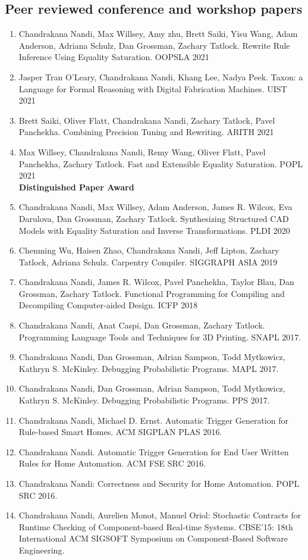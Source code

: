 \documentclass[margin, 10pt]{res} %
\begin{document}
\begin{resume}
\subsection{Peer reviewed conference and workshop papers}
\begin{enumerate}
  \item Chandrakana Nandi, Max Willsey, Amy zhu, Brett Saiki, Yisu Wang, Adam Anderson, Adriana Schulz, Dan Grossman, Zachary Tatlock.
    Rewrite Rule Inference Using Equality Saturation. OOPSLA 2021
\item Jasper Tran O'Leary, Chandrakana Nandi, Khang Lee, Nadya Peek.
  Taxon: a Language for Formal Reasoning with Digital Fabrication Machines. UIST 2021
\item Brett Saiki, Oliver Flatt, Chandrakana Nandi, Zachary Tatlock, Pavel Panchekha.
  Combining Precision Tuning and Rewriting. ARITH 2021
\item    Max Willsey, Chandrakana Nandi, Remy Wang, Oliver Flatt, Pavel Panchekha, Zachary Tatlock.
    Fast and Extensible Equality Saturation. POPL 2021 \\
    \textbf{Distinguished Paper Award}
\item Chandrakana Nandi, Max Willsey, Adam Anderson, James R. Wilcox, Eva Darulova, Dan Grossman, Zachary Tatlock.
    Synthesizing Structured CAD Models with Equality Saturation and Inverse Transformations. PLDI 2020
\item Chenming Wu, Haisen Zhao, Chandrakana Nandi, Jeff Lipton, Zachary Tatlock, Adriana Schulz. Carpentry Compiler. SIGGRAPH ASIA 2019
\item Chandrakana Nandi, James R. Wilcox, Pavel Panchekha, Taylor Blau, Dan Grossman, Zachary Tatlock. Functional Programming for Compiling and Decompiling Computer-aided Design. ICFP 2018
\item Chandrakana Nandi, Anat Caspi, Dan Grossman, Zachary Tatlock. Programming Language Tools and Techniques for 3D Printing. SNAPL 2017.
\item Chandrakana Nandi, Dan Grossman, Adrian Sampson, Todd Mytkowicz, Kathryn S. McKinley. Debugging Probabilistic Programs. MAPL 2017.
\item Chandrakana Nandi, Dan Grossman, Adrian Sampson, Todd Mytkowicz, Kathryn S. McKinley. Debugging Probabilistic Programs. PPS 2017.
\item Chandrakana Nandi, Michael D. Ernst. Automatic Trigger Generation for Rule-based Smart Homes. ACM SIGPLAN PLAS 2016.
\item Chandrakana Nandi. Automatic Trigger Generation for End User Written Rules for Home Automation. ACM FSE SRC 2016.
\item Chandrakana Nandi: Correctness and Security for Home Automation. POPL SRC 2016.
\item Chandrakana Nandi, Aurelien Monot, Manuel Oriol: Stochastic Contracts for Runtime Checking of Component-based Real-time Systems. CBSE'15: 18th International ACM SIGSOFT Symposium on Component-Based Software Engineering.
\end{enumerate}

\end{resume}
\end{document}
